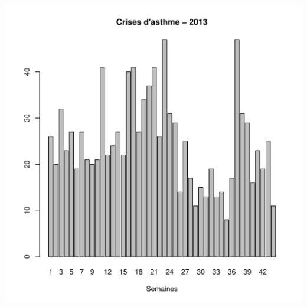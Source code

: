 \documentclass[12pt,english,french,twoside]{report}\usepackage[]{graphicx}\usepackage[]{color}
\makeatletter
\def\maxwidth{ %
  \ifdim\Gin@nat@width>\linewidth
    \linewidth
  \else
    \Gin@nat@width
  \fi
}
\makeatother
\begin{document}
\includegraphics[width=\maxwidth]{figure/asthme21} 
\end{document}
